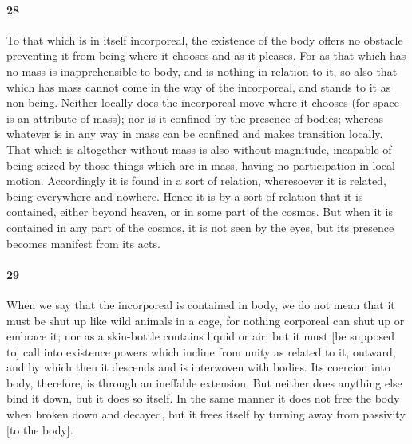 \documentclass[12pt]{article}
\begin{document}
\paragraph{28} To that which is in itself incorporeal, the existence of the
body offers no obstacle preventing it from being where it chooses and as it
pleases. For as that which has no mass is inapprehensible to body, and is
nothing in relation to it, so also that which has mass cannot come in the way
of the incorporeal, and stands to it as non-being. Neither locally does the
incorporeal move where it chooses (for space is an attribute of mass); nor is
it confined by the presence of bodies; whereas whatever is in any way in mass
can be confined and makes transition locally. That which is altogether without
mass is also without magnitude, incapable of being seized by those things which
are in mass, having no participation in local motion. Accordingly it is found
in a sort of relation, wheresoever it is related, being everywhere and nowhere.
Hence it is by a sort of relation that it is contained, either beyond heaven,
or in some part of the cosmos. But when it is contained in any part of the
cosmos, it is not seen by the eyes, but its presence becomes manifest from its
acts.

\paragraph{29} When we say that the incorporeal is contained in body, we do not
mean that it must be shut up like wild animals in a cage, for nothing corporeal
can shut up or embrace it; nor as a skin-bottle contains liquid or air; but it
must [be supposed to] call into existence powers which incline from unity as
related to it, outward, and by which then it descends and is interwoven with
bodies. Its coercion into body, therefore, is through an ineffable extension.
But neither does anything else bind it down, but it does so itself. In the same
manner it does not free the body when broken down and decayed, but it frees
itself by turning away from passivity [to the body].
\end{document}
